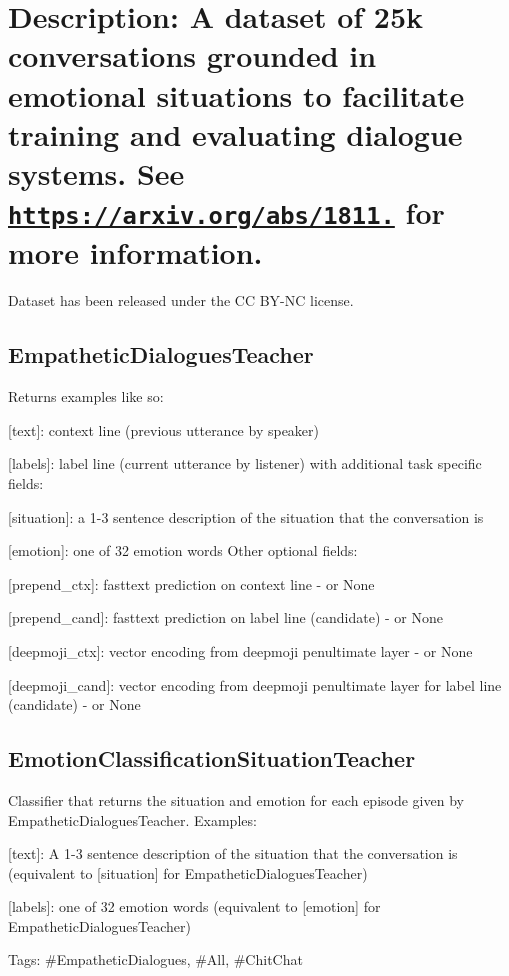 \section*{Description\+: A dataset of 25k conversations grounded in emotional situations to facilitate training and evaluating dialogue systems. See \href{https://arxiv.org/abs/1811.00207}{\tt https\+://arxiv.\+org/abs/1811.} for more information. }

Dataset has been released under the CC B\+Y-\/\+NC license.

\subsection*{Empathetic\+Dialogues\+Teacher}

Returns examples like so\+:
\begin{DoxyItemize}
\item \mbox{[}text\mbox{]}\+: context line (previous utterance by \textquotesingle{}speaker\textquotesingle{})
\item \mbox{[}labels\mbox{]}\+: label line (current utterance by \textquotesingle{}listener\textquotesingle{}) with additional task specific fields\+:
\item \mbox{[}situation\mbox{]}\+: a 1-\/3 sentence description of the situation that the conversation is
\item \mbox{[}emotion\mbox{]}\+: one of 32 emotion words Other optional fields\+:
\item \mbox{[}prepend\+\_\+ctx\mbox{]}\+: fasttext prediction on context line -\/ or None
\item \mbox{[}prepend\+\_\+cand\mbox{]}\+: fasttext prediction on label line (candidate) -\/ or None
\item \mbox{[}deepmoji\+\_\+ctx\mbox{]}\+: vector encoding from deepmoji penultimate layer -\/ or None
\item \mbox{[}deepmoji\+\_\+cand\mbox{]}\+: vector encoding from deepmoji penultimate layer for label line (candidate) -\/ or None
\end{DoxyItemize}

\subsection*{Emotion\+Classification\+Situation\+Teacher}

Classifier that returns the situation and emotion for each episode given by {\ttfamily Empathetic\+Dialogues\+Teacher}. Examples\+:
\begin{DoxyItemize}
\item \mbox{[}text\mbox{]}\+: A 1-\/3 sentence description of the situation that the conversation is (equivalent to \mbox{[}situation\mbox{]} for {\ttfamily Empathetic\+Dialogues\+Teacher})
\item \mbox{[}labels\mbox{]}\+: one of 32 emotion words (equivalent to \mbox{[}emotion\mbox{]} for {\ttfamily Empathetic\+Dialogues\+Teacher})
\end{DoxyItemize}

Tags\+: \#\+Empathetic\+Dialogues, \#\+All, \#\+Chit\+Chat 